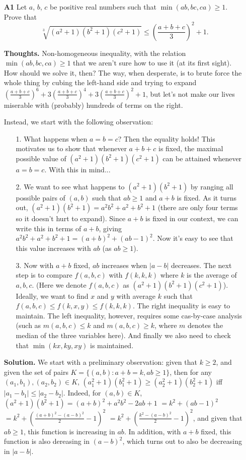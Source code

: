 \documentclass[11pt,a4paper]{article}
\begin{document}
\begin{itemize}
\item[\textbf{A1}]
Let $a$, $b$, $c$ be positive real numbers such that $\min(ab,bc,ca) \ge 1$. Prove that $$\sqrt[3]{(a^2+1)(b^2+1)(c^2+1)} \le \left(\frac{a+b+c}{3}\right)^2 + 1.$$

\textbf{Thoughts.} 
Non-homogeneous inequality, with the relation $\min(ab,bc,ca) \ge 1$ that we aren't sure how to use it (at its first sight). 
How should we solve it, then? 
The way, when desperate, is to brute force the whole thing by cubing the left-hand side and trying to expand 
$\left(\frac{a+b+c}{3}\right)^6+3\left(\frac{a+b+c}{3}\right)^4+3\left(\frac{a+b+c}{3}\right)^2+1$, 
but let's not make our lives miserable with (probably) hundreds of terms on the right. 

Instead, we start with the following observation: 
\begin{itemize}
\item [1.] What happens when $a=b=c$? Then the equality holds! 
This motivates us to show that whenever $a+b+c$ is fixed, the maximal possible value of $(a^2+1)(b^2+1)(c^2+1)$ can be attained whenever $a=b=c$. With this in mind...
\item [2.] We want to see what happens to $(a^2+1)(b^2+1)$ by ranging all possible pairs of $(a,b)$ such that $ab\ge 1$ and $a+b$ is fixed. 
As it turns out, $(a^2+1)(b^2+1)=a^2b^2+a^2+b^2+1$ (there are only four terms so it doesn't hurt to expand). 
Since $a+b$ is fixed in our context, we can write this in terms of $a+b$, giving 
$a^2b^2+a^2+b^2+1=(a+b)^2+(ab-1)^2$. 
Now it's easy to see that this value increases with $ab$ (as $ab\ge 1$). 
\item [3.] Now with $a+b$ fixed, $ab$ increases when $|a-b|$ decreases. 
The next step is to compare $f(a,b,c)$ with $f(k,k,k)$ where $k$ is the average of $a,b,c$. 
(Here we denote $f(a,b,c)$ as $(a^2+1)(b^2+1)(c^2+1)$). 
Ideally, we want to find $x$ and $y$ with average $k$ such that 
$f(a,b,c)\le f(k,x,y)\le f(k,k,k)$. 
The right inequality is easy to maintain. 
The left inequality, however, requires some cas-by-case analysis (such as $m(a,b,c)\le k$ and $m(a,b,c)\ge k$, where $m$ denotes the median of the three variables here). 
And finally we also need to check that $\min(kx, ky, xy)$ is maintained.
\end{itemize}

\textbf{Solution.} 
We start with a preliminary observation: 
given that $k\ge 2$, and given the set of pairs $K=\{(a,b): a+b=k, ab\ge 1\}$, 
then for any $(a_1,b_1), (a_2, b_2)\in K$, 
$(a_1^2+1)(b_1^2+1)\ge (a_2^2+1)(b_2^2+1)$ iff $|a_1-b_1|\le |a_2-b_2|$. 
Indeed, for $(a,b)\in K$, $(a^2+1)(b^2+1)=(a+b)^2+a^2b^2-2ab+1$
$=k^2+(ab-1)^2$
$=k^2+(\frac{(a+b)^2-(a-b)^2}{2}-1)^2$
$=k^2+(\frac{k^2-(a-b)^2}{2}-1)^2$, 
and given that $ab\ge 1$, this function is increasing in $ab$. 
In addition, with $a+b$ fixed, this function is also dereasing in $(a-b)^2$, which turns out to also be decreasing in $|a-b|$. 


\end{itemize}
\end{document}
